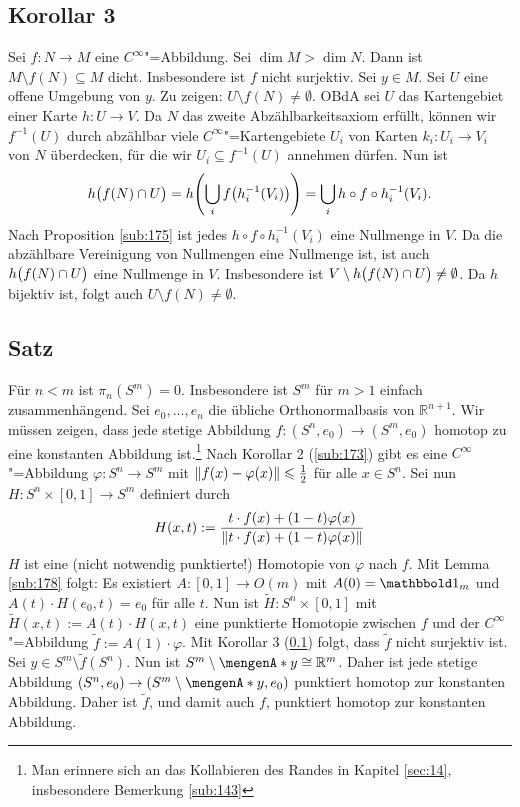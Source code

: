 \subsection[Korollar 3: Für $f : N \to M$ glatt ist $M \setminus f(N) \subseteq M$ dicht, wenn $\dim M > \dim N$]{Korollar 3} %
\label{sub:176}
Sei $f : N \to M$ eine $C^\infty$"=Abbildung. Sei $\dim M > \dim N$. Dann ist $M \setminus f(N) \subseteq M$ dicht. Insbesondere ist $f$ nicht surjektiv.
Sei $y \in M$. Sei $U$ eine offene Umgebung von $y$. Zu zeigen: $U \setminus f(N) \not= \emptyset$. OBdA sei $U$ das Kartengebiet einer Karte $h : U\to V$. Da $N$ das 
zweite Abzählbarkeitsaxiom erfüllt, können wir $f ^{-1}(U)$ durch abzählbar viele $C^\infty$"=Kartengebiete $U_i$ von Karten $k_i : U_i \to V_i$ von $N$ überdecken, für die
wir $U_i \subseteq f ^{-1}(U)$ annehmen dürfen. Nun ist
\[
	h \enbrace[\big]{f(N) \cap U}  = h \enbrace*{\bigcup_{i} f\enbrace*{h_i ^{-1}(V_i)}} = \bigcup_i h \circ f \circ h_i ^{-1} (V_i).
\]
Nach Proposition \ref{sub:175} ist jedes $h \circ f \circ h_i ^{-1}(V_i)$ eine Nullmenge in $V$. Da die abzählbare Vereinigung von Nullmengen eine Nullmenge ist, ist auch
$h \enbrace[\big]{f(N) \cap U}$ eine Nullmenge in $V$. Insbesondere ist $V \setminus h \enbrace[\big]{f(N)\cap U} \not= \emptyset$. Da $h$ bijektiv ist, folgt auch 
$U \setminus f(N) \not= \emptyset$. \bewende 

\subsection[Satz: Für $n < m$ ist $\pi_n (S^m) = 0$]{Satz} %
\label{sub:177}
Für $n < m$ ist $\pi_n (S^m) = 0$. Insbesondere ist $S^m$ für $m>1$ einfach zusammenhängend.
Sei $e_0, \ldots , e_n$ die übliche Orthonormalbasis von $\mathds{R}^{n+1}$.
Wir müssen zeigen, dass jede stetige Abbildung $f : (S^n, e_0) \to (S^m, e_0)$ homotop zu eine konstanten Abbildung ist.\footnote{Man erinnere sich an das Kollabieren des 
Randes in Kapitel \ref{sec:14}, insbesondere Bemerkung \ref{sub:143}} Nach Korollar 2 (\ref{sub:173}) gibt es eine 
$C^\infty$"=Abbildung $\varphi : S^n \to S^m$ mit $\norm{f(x)- \varphi(x)} \le \frac{1}{2}$ für alle $x \in S^n$. Sei nun $H : S^n \times [0,1] \to S^m$ definiert durch
\[
	H(x,t) := \frac{t \cdot f(x)+ (1-t)\varphi(x)}{\norm{t \cdot f(x) + (1-t) \varphi(x)}} 
\]
$H$ ist eine (nicht notwendig punktierte!) Homotopie von $\varphi$ nach $f$. Mit Lemma \ref{sub:178} folgt: Es existiert $A : [0,1] \to O(m)$ mit $A(0)= \ind_m$ und
$A(t) \cdot H(e_0,t) = e_0$ für alle $t$. Nun ist $\tilde{H} : S^n \times [0,1]$ mit $\tilde{H}(x,t) := A(t) \cdot H(x,t)$ eine punktierte Homotopie zwischen $f$ und
der $C^\infty$"=Abbildung $\tilde{f} := A(1) \cdot \varphi$. Mit Korollar 3 (\ref{sub:176}) folgt, dass $\tilde{f}$ nicht surjektiv ist. Sei $y \in S^m \setminus \tilde{f}(S^n)$. Nun ist
$S^m \setminus \set{y} \cong \mathds{R}^m$. Daher ist jede stetige Abbildung $(S^n, e_0) \to (S^m \setminus \set{y} ,e_0)$ punktiert homotop zur konstanten Abbildung. Daher ist $\tilde{f}$,
und damit auch $f$, punktiert homotop zur konstanten Abbildung. \bewende

